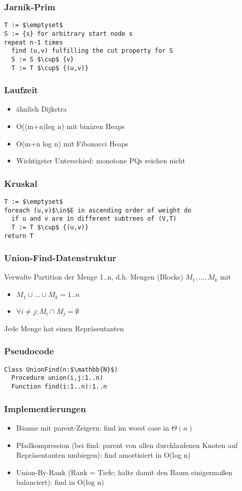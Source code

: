 \begin{frame}[fragile]
\frametitle{Jarník-Prim}
\begin{lstlisting}
T := $\emptyset$
S := {s} for arbitrary start node s
repeat n-1 times
  find (u,v) fulfilling the cut property for S
  S := S $\cup$ {v}
  T := T $\cup$ {(u,v)}
\end{lstlisting}
\end{frame}

\begin{frame}
\frametitle{Laufzeit}
\begin{itemize}
\item ähnlich Dijkstra
\item O((m+n)log n) mit binären Heaps
\item O(m+n log n) mit Fibonacci Heaps\pause
\item Wichtigster Unterschied: monotone PQs reichen nicht
\end{itemize}
\end{frame}

\begin{frame}[fragile]
\frametitle{Kruskal}
\begin{lstlisting}
T := $\emptyset$
foreach (u,v)$\in$E in ascending order of weight do
  if u and v are in different subtrees of (V,T)
  T := T $\cup$ {(u,v)}
return T
\end{lstlisting}
\end{frame}

\begin{frame}
\frametitle{Union-Find-Datenstruktur}
Verwalte Partition der Menge 1..n, d.h. Mengen (Blocks) $M_1,\ldots,M_k$ mit
\begin{itemize}
\item $M_1\cup\ldots\cup M_k=1..n$
\item $\forall i\neq j:M_i\cap M_j=\emptyset$
\end{itemize}\pause
Jede Menge hat einen Repräsentanten
\end{frame}

\begin{frame}[fragile]
\frametitle{Pseudocode}
\begin{lstlisting}
Class UnionFind(n:$\mathbb{N}$)
  Procedure union(i,j:1..n)
  Function find(i:1..n):1..n
\end{lstlisting}
\end{frame}

\begin{frame}
\frametitle{Implementierungen}
\begin{itemize}
\item Bäume mit parent-Zeigern: find im worst case in $\Theta(n)$\pause
\item Pfadkompression (bei find: parent von allen durchlaufenen Knoten auf Repräsentanten umbiegen): find amortisiert in O(log n)\pause
\item Union-By-Rank (Rank = Tiefe; halte damit den Baum einigermaßen balanciert): find in O(log n)
\end{itemize}
\end{frame}

